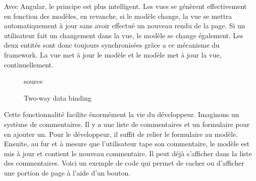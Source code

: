 \documentclass[letterpaper,10pt,oneside]{sphinxmanual}
\begin{document}
Avec Angular, le principe est plus intelligent. Les vues se génèrent effectivement en fonction des modèles, en revanche, si le modèle change, la vue se mettra automatiquement à jour sans avoir effectué un nouveau rendu de la page. Si un utilisateur fait un changement dans la vue, le modèle se change également. Les deux entités sont donc toujours synchronisées grâce a ce mécanisme du framework. La vue met à jour le modèle et le modèle met à jour la vue, continuellement.
\begin{figure}[htbp]
\centering
\capstart

\caption{Two-way data binding}{\small 
source \footnotemark[8]
}\end{figure}

Cette fonctionnalité facilite énormément la vie du développeur. Imaginons un système de commentaires. Il y a une liste de commentaires et un formulaire pour en ajouter un. Pour le développeur, il suffit de relier le formulaire au modèle. Ensuite, au fur et à mesure que l'utilisateur tape son commentaire, le modèle est mis à jour et contient le nouveau commentaire. Il peut déjà s'afficher dans la liste des commentaires. Voici un exemple de code qui permet de cacher ou d'afficher une portion de page à l'aide d'un bouton.
\end{document}
